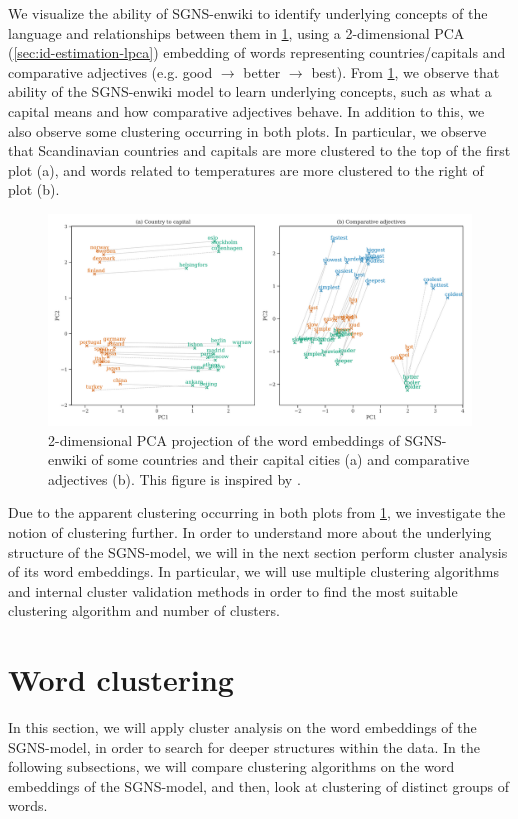 We visualize the ability of SGNS-enwiki to identify underlying concepts of the language and relationships between them in \cref{fig:sgns-enwiki-word-to-word-relations-pca-2d}, using a 2-dimensional PCA (\cref{sec:id-estimation-lpca}) embedding of words representing countries/capitals and comparative adjectives (e.g. good $\rightarrow$ better $\rightarrow$ best). From \cref{fig:sgns-enwiki-word-to-word-relations-pca-2d}, we observe that ability of the SGNS-enwiki model to learn underlying concepts, such as what a capital means and how comparative adjectives behave. In addition to this, we also observe some clustering occurring in both plots. In particular, we observe that Scandinavian countries and capitals are more clustered to the top of the first plot (a), and words related to temperatures are more clustered to the right of plot (b).
\begin{figure}[H]
   \centering
   \includegraphics[width=\textwidth]{thesis/figures/word-to-word-relationships-pca-2d.pdf}
 \caption{2-dimensional PCA projection of the word embeddings of SGNS-enwiki of some countries and their capital cities (a) and comparative adjectives (b). This figure is inspired by \cite[Figure 2]{mikolov2013b}.}
 \label{fig:sgns-enwiki-word-to-word-relations-pca-2d}
\end{figure}

Due to the apparent clustering occurring in both plots from \cref{fig:sgns-enwiki-word-to-word-relations-pca-2d}, we investigate the notion of clustering further. In order to understand more about the underlying structure of the SGNS-model, we will in the next section perform cluster analysis of its word embeddings. In particular, we will use multiple clustering algorithms and internal cluster validation methods in order to find the most suitable clustering algorithm and number of clusters.

\section{Word clustering}
In this section, we will apply cluster analysis on the word embeddings of the SGNS-model, in order to search for deeper structures within the data. In the following subsections, we will compare clustering algorithms on the word embeddings of the SGNS-model, and then, look at clustering of distinct groups of words.

